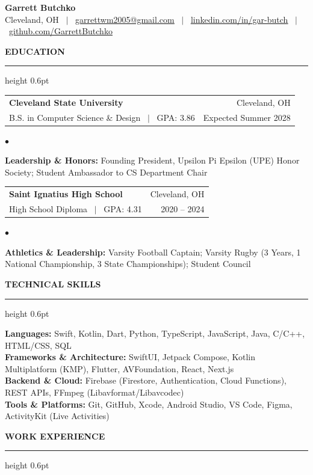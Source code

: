 \documentclass[letterpaper,10pt]{article}
\makeatletter
\newcommand{\resumesection}[1]{%
  \vspace{4pt}%
  {\large\textbf{\uppercase{#1}}}%
  \vspace{1pt}\hrule height 0.6pt\vspace{3pt}%
}
\newenvironment{resumelist}{%
  \begin{list}{$\bullet$}{%
    \setlength{\leftmargin}{1.2em}%
    \setlength{\itemsep}{1pt}%
    \setlength{\parsep}{0pt}%
    \setlength{\topsep}{1.5pt}%
    \setlength{\partopsep}{0pt}%
  }%
}{%
  \end{list}%
}
\newcommand{\resumeSubheading}[4]{%
  \vspace{2pt}%
  \begin{tabular*}{1.0\textwidth}[t]{l@{\extracolsep{\fill}}r}%
    \textbf{#1} & #2 \\%
    \small #3 & \small #4 \\%
  \end{tabular*}\vspace{-1pt}%
}
\makeatother
\begin{document}
\begin{center}
    {\Huge \textbf{Garrett Butchko}} \\ \vspace{2pt}
    \small Cleveland, OH \ $\vert$ \ 
    \href{mailto:garrettwm2005@gmail.com}{\underline{garrettwm2005@gmail.com}} \ $\vert$ \ 
    \href{https://www.linkedin.com/in/gar-butch/}{\underline{linkedin.com/in/gar-butch}} \ $\vert$ \ 
    \href{https://github.com/GarrettButchko}{\underline{github.com/GarrettButchko}}
\end{center}
\vspace{-6pt}

\resumesection{Education}
  \resumeSubheading
    {Cleveland State University}{Cleveland, OH}
    {B.S. in Computer Science \& Design \ $\vert$ \ GPA: 3.86}{Expected Summer 2028}
    \begin{resumelist}
      \item \small{\textbf{Leadership \& Honors:} Founding President, Upsilon Pi Epsilon (UPE) Honor Society; Student Ambassador to CS Department Chair}
    \end{resumelist}

  \resumeSubheading
    {Saint Ignatius High School}{Cleveland, OH}
    {High School Diploma \ $\vert$ \ GPA: 4.31}{2020 -- 2024}
    \begin{resumelist}
      \item \small{\textbf{Athletics \& Leadership:} Varsity Football Captain; Varsity Rugby (3 Years, 1 National Championship, 3 State Championships); Student Council}
    \end{resumelist}

\resumesection{Technical Skills}
  \vspace{1pt}
  \small{
   \textbf{Languages:} Swift, Kotlin, Dart, Python, TypeScript, JavaScript, Java, C/C++, HTML/CSS, SQL \\
   \textbf{Frameworks \& Architecture:} SwiftUI, Jetpack Compose, Kotlin Multiplatform (KMP), Flutter, AVFoundation, React, Next.js \\
   \textbf{Backend \& Cloud:} Firebase (Firestore, Authentication, Cloud Functions), REST APIs, FFmpeg (Libavformat/Libavcodec) \\
   \textbf{Tools \& Platforms:} Git, GitHub, Xcode, Android Studio, VS Code, Figma, ActivityKit (Live Activities)
  }
  \vspace{1pt}

\resumesection{Work Experience}
\end{document}
